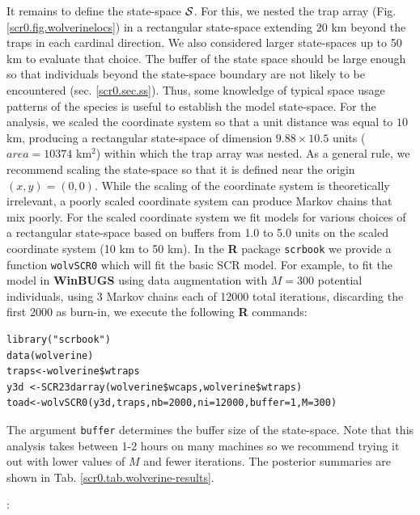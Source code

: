 {It remains to define the
state-space ${\cal S}$. For this, we nested the trap array (Fig.
\ref{scr0.fig.wolverinelocs}) in a
 rectangular state-space extending $20$ km beyond the traps in each cardinal
direction.  We also considered larger state-spaces up to 50 km to
evaluate that choice.  The buffer of the state space should be large
enough so that individuals beyond the state-space boundary are not
likely to be encountered
(sec. \ref{scr0.sec.ss}).
Thus, some knowledge of typical space usage
patterns of the species is useful to establish the model state-space.  For the analysis, 
we scaled the coordinate system 
so that a unit distance was equal to $10$ km, producing a rectangular
state-space of dimension $9.88 \times 10.5$ units ($area = 10374$ km$^2$)
within which the trap array was nested. As a general rule, we
recommend scaling the state-space so that it is defined near the
origin $(x,y)=(0,0)$. While the scaling of the coordinate system is
theoretically irrelevant, a poorly scaled coordinate system can
produce Markov chains that mix poorly.  For the scaled coordinate
system we fit models for various choices of a rectangular state-space
based on 
buffers from 1.0 to 5.0 units on the scaled coordinate system (10 km to
50 km). In the {\bf R} package \mbox{\tt scrbook} we provide a
function
\mbox{\tt wolvSCR0} which will fit the basic SCR model. For
example, to fit the model in 
{\bf WinBUGS} using data augmentation with $M=300$ potential individuals,
using 3 Markov chains each of 12000 total iterations, discarding the
first 2000 as burn-in, we execute the following {\bf R} commands:
{\small
\begin{verbatim}
library("scrbook")
data(wolverine)
traps<-wolverine$wtraps
y3d <-SCR23darray(wolverine$wcaps,wolverine$wtraps)
toad<-wolvSCR0(y3d,traps,nb=2000,ni=12000,buffer=1,M=300)
\end{verbatim}
}
The argument \mbox{\tt buffer} determines the buffer size of the state-space.
Note that this analysis takes 
between 1-2 hours on many machines so we recommend trying it out with
lower values of $M$ and fewer iterations.
The posterior summaries are shown in 
Tab. \ref{scr0.tab.wolverine-results}.

:

}
